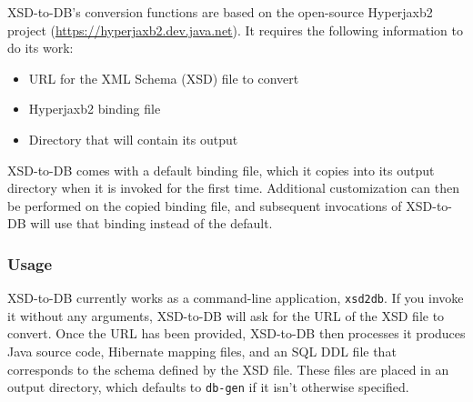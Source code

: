 \documentclass[11pt]{article}
\begin{document}
XSD-to-DB's conversion functions are based on the open-source Hyperjaxb2 project (\url{https://hyperjaxb2.dev.java.net}).  It requires the following information to do its work:
\begin{itemize}
\item URL for the XML Schema (XSD) file to convert
\item Hyperjaxb2 binding file
\item Directory that will contain its output
\end{itemize}
XSD-to-DB comes with a default binding file, which it copies into its output directory when it is invoked for the first time.  Additional customization can then be performed on the copied binding file, and subsequent invocations of XSD-to-DB will use that binding instead of the default.

\subsubsection{Usage}

XSD-to-DB currently works as a command-line application, \texttt{xsd2db}.  If you invoke it without any arguments, XSD-to-DB will ask for the URL of the XSD file to convert.  Once the URL has been provided, XSD-to-DB then processes it produces Java source code, Hibernate mapping files, and an SQL DDL file that corresponds to the schema defined by the XSD file.  These files are placed in an output directory, which defaults to \texttt{db-gen} if it isn't otherwise specified.
\end{document}

